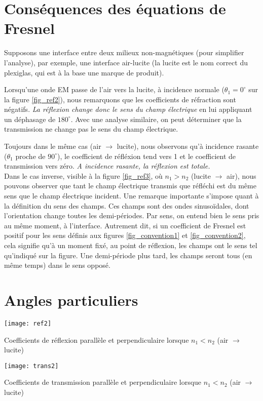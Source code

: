 \section{Conséquences des équations de Fresnel}
Supposons une interface entre deux milieux non-magnétiques (pour simplifier l'analyse), par exemple, une interface air-lucite (la lucite est le nom correct du plexiglas, qui est à la base une marque de produit).

Lorsqu'une onde EM passe de l'air vers la lucite, à incidence normale ($\theta_1=0^\circ$ sur la figure \ref{fig_ref2}), nous remarquons que les coefficients de réfraction sont négatifs. \textit{La réflexion change donc le sens du champ électrique} en lui appliquant un déphasage de $180^\circ$. Avec une analyse similaire, on peut déterminer que la transmission ne change pas le sens du champ électrique.

Toujours dans le même cas (air $\rightarrow$ lucite), nous observons qu'à incidence rasante ($\theta_1$ proche de $90^\circ$), le coefficient de réfléxion tend vers 1 et le coefficient de transmission vers zéro. \textit{A incidence rasante, la réflexion est totale.}\\

Dans le cas inverse, visible à la figure \ref{fig_ref3}, où $n_1>n_2$ (lucite $\rightarrow$ air), nous pouvons observer que tant le champ électrique transmis que réfléchi est du même sens que le champ électrique incident. Une remarque importante s'impose quant à la définition du sens des champs. Ces champs sont des ondes sinusoïdales, dont l'orientation change toutes les demi-périodes. Par sens, on entend bien le sens pris au même moment, à l'interface. Autrement dit, si un coefficient de Fresnel est positif pour les sens définis aux figures \ref{fig_convention1} et \ref{fig_convention2}, cela signifie qu'à un moment fixé, au point de réflexion, les champs ont le sens tel qu'indiqué sur la figure. Une demi-période plus tard, les champs seront tous (en même temps) dans le sens opposé. 

\section{Angles particuliers}
\begin{marginfigure}[-4cm]
	\texttt{[image: ref2]}
	\caption{Coefficients de réflexion parallèle et perpendiculaire lorsque $n_1<n_2$ (air $\rightarrow$ lucite)}
	\label{fig_ref2}
\end{marginfigure} 
\begin{marginfigure}[0cm]
	\texttt{[image: trans2]}
	\caption{Coefficients de transmission parallèle et perpendiculaire lorsque $n_1<n_2$ (air $\rightarrow$ lucite)}
	\label{fig_trans2}
\end{marginfigure} 

